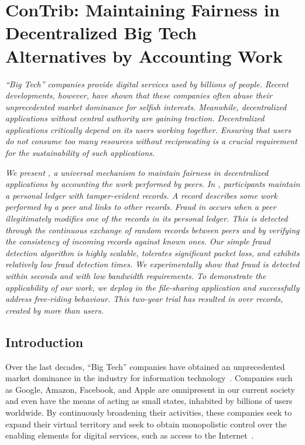 \chapter{ConTrib: Maintaining Fairness in Decentralized Big Tech Alternatives by Accounting Work}
\label{chapter:trustchain}

\emph{\enquote{Big Tech} companies provide digital services used by billions of people.
Recent developments, however, have shown that these companies often abuse their unprecedented market dominance for selfish interests.
Meanwhile, decentralized applications without central authority are gaining traction.
Decentralized applications critically depend on its users working together.
Ensuring that users do not consume too many resources without reciprocating is a crucial requirement for the sustainability of such applications.}

\emph{We present \ModelName{}, a universal mechanism to maintain fairness in decentralized applications by accounting the work performed by peers.
In \ModelName{}, participants maintain a personal ledger with tamper-evident records.
A record describes some work performed by a peer and links to other records.
Fraud in \ModelName{} occurs when a peer illegitimately modifies one of the records in its personal ledger.
This is detected through the continuous exchange of random records between peers and by verifying the consistency of incoming records against known ones.
Our simple fraud detection algorithm is highly scalable, tolerates significant packet loss, and exhibits relatively low fraud detection times.
We experimentally show that fraud is detected within seconds and with low bandwidth requirements.
To demonstrate the applicability of our work, we deploy \ModelName{} in the \Tribler{} file-sharing application and successfully address free-riding behaviour.
This two-year trial has resulted in over \TrialRecords{} records, created by more than \TrialUsers{} users.}

\newpage

\section{Introduction}

Over the last decades, \enquote{Big Tech} companies have obtained an unprecedented market dominance in the industry for information technology~\cite{frost2019bigtech}.
Companies such as Google, Amazon, Facebook, and Apple are omnipresent in our current society and even have the means of acting as small states, inhabited by billions of users worldwide.
By continuously broadening their activities, these companies seek to expand their virtual territory and seek to obtain monopolistic control over the enabling elements for digital services, such as access to the Internet~\cite{best2014internet}.


